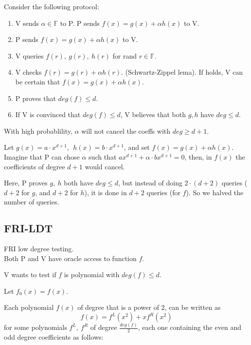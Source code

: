 \documentclass{article}
\theoremstyle{definition}
\begin{document}
Consider the following protocol:

\begin{enumerate}
	\item V sends $\alpha \in \mathbb{F}$ to P. P sends $f(x) = g(x) + \alpha h(x)$ to V.
	\item P sends $f(x)=g(x) + \alpha h(x)$ to V.
	\item V queries $f(r), ~g(r), ~h(r)$ for rand $r \in \mathbb{F}$.
	\item V checks $f(r)=g(r) + \alpha h(r)$. (Schwartz-Zippel lema).
		If holds, V can be certain that $f(x)=g(x)+ \alpha h(x)$.
	\item P proves that $deg(f) \leq d$. 
	\item If V is convinced that $deg(f) \leq d$, V believes that both $g, h$ have $deg \leq d$.
\end{enumerate}

With high probablility, $\alpha$ will not cancel the coeffs with $deg \geq d+1$. %

Let $g(x)=a \cdot x^{d+1}, ~~ h(x)=b \cdot x^{d+1}$, and set $f(x) = g(x) + \alpha h(x)$.
Imagine that P can chose $\alpha$ such that $a x^{d+1} + \alpha \cdot b x^{d+1} = 0$, then, in $f(x)$ the coefficients of degree $d+1$ would cancel.

\quad

Here, P proves $g,~h$ both have $deg \leq d$, but instead of doing $2 \cdot (d+2)$ queries ($d+2$ for $g$, and $d+2$ for $h$), it is done in $d+2$ queries (for $f$).
So we halved the number of queries.


\subsection{FRI-LDT}\label{sec:fri-ldt}
FRI low degree testing.\\
Both P and V have oracle access to function $f$.

V wants to test if $f$ is polynomial with $deg(f) \leq d$.

Let $f_0(x)=f(x)$.

Each polynomial $f(x)$ of degree that is a power of $2$, can be written as
$$f(x) = f^L(x^2) + x f^R(x^2)$$
for some polynomials $f^L,~f^R$ of degree $\frac{deg(f)}{2}$, each one containing the even and odd degree coefficients as follows:

\end{document}
